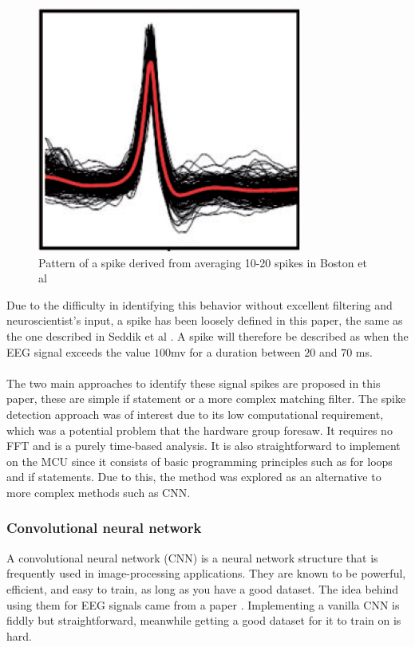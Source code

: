 \begin{figure}
    \centering
    \includegraphics{text/SpikePatterFromStudie.png}
    \caption{Pattern of a spike derived from averaging 10-20 spikes in Boston et al \cite{MatchingFilter}}
    \label{fig:Patternstudie}
\end{figure}

Due to the difficulty in identifying this behavior without excellent filtering and neuroscientist's input, a spike has been loosely defined in this paper, the same as the one described in Seddik et al \cite{SpikeDetection}. A spike will therefore be described as when the EEG signal exceeds the value $100$mv for a duration between $20$ and $70$ ms.\\
\\
The two main approaches to identify these signal spikes are proposed in this paper, these are simple if statement or a more complex matching filter. The spike detection approach was of interest due to its low computational requirement, which was a potential problem that the hardware group foresaw. It requires no FFT and is a purely time-based analysis. It is also straightforward to implement on the MCU since it consists of basic programming principles such as for loops and if statements. Due to this, the method was explored as an alternative to more complex methods such as CNN. 



\subsubsection{Convolutional neural network}

A convolutional neural network (CNN) is a neural network structure that is frequently used in image-processing applications. They are known to be powerful, efficient, and easy to train, as long as you have a good dataset. The idea behind using them for EEG signals came from a paper \cite{CNNpaper}. Implementing a vanilla CNN is fiddly but straightforward, meanwhile getting a good dataset for it to train on is hard. \\

